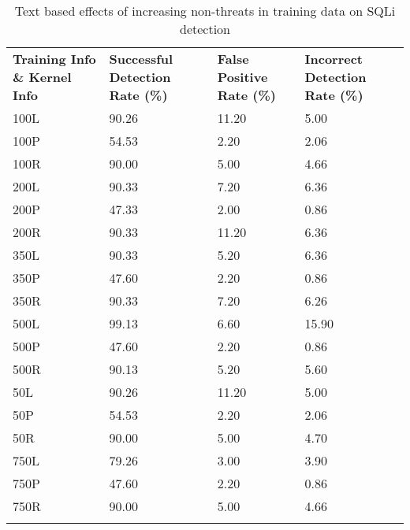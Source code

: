 \begin{appendices}
\begin{longtable}{|p{1.5in}|p{1in}|p{1in}|p{1in}|}
	\hline
	\textbf{Training Info \& Kernel Info} & \textbf{Successful Detection Rate (\%)} & \textbf{False Positive Rate (\%)} & \textbf{Incorrect Detection Rate (\%)}  \\
	\hhline{|=|=|=|=|}
 	100L & 90.26 & 11.20 &  5.00 \\ \hline
 	100P & 54.53 &  2.20 &  2.06 \\ \hline
 	100R & 90.00 &  5.00 &  4.66 \\ \hline
 	200L & 90.33 &  7.20 &  6.36 \\ \hline
 	200P & 47.33 &  2.00 &  0.86 \\ \hline
 	200R & 90.33 & 11.20 &  6.36 \\ \hline
 	350L & 90.33 &  5.20 &  6.36 \\ \hline
 	350P & 47.60 &  2.20 &  0.86 \\ \hline
 	350R & 90.33 &  7.20 &  6.26 \\ \hline
 	500L & 99.13 &  6.60 & 15.90 \\ \hline
 	500P & 47.60 &  2.20 &  0.86 \\ \hline
 	500R & 90.13 &  5.20 &  5.60 \\ \hline
  	50L & 90.26 & 11.20 &  5.00 \\ \hline
  	50P & 54.53 &  2.20 &  2.06 \\ \hline
  	50R & 90.00 &  5.00 &  4.70 \\ \hline
 	750L & 79.26 &  3.00 &  3.90 \\ \hline
 	750P & 47.60 &  2.20 &  0.86 \\ \hline
 	750R & 90.00 &  5.00 &  4.66 \\ \hline
 	\caption[]{Text based effects of increasing non-threats in training data on SQLi detection}
 	\label{app:sqlNonThreatText}
\end{longtable}


\end{appendices}
